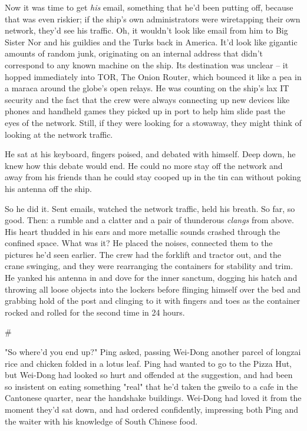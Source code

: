 Now it was time to get \emph{his} email, something that he'd been
putting off, because that was even riskier; if the ship's own
administrators were wiretapping their own network, they'd see his
traffic. Oh, it wouldn't look like email from him to Big Sister Nor
and his guildies and the Turks back in America. It'd look like
gigantic amounts of random junk, originating on an internal address
that didn't correspond to any known machine on the ship. Its
destination was unclear -- it hopped immediately into TOR, The
Onion Router, which bounced it like a pea in a maraca around the
globe's open relays. He was counting on the ship's lax IT security
and the fact that the crew were always connecting up new devices
like phones and handheld games they picked up in port to help him
slide past the eyes of the network. Still, if they were looking for
a stowaway, they might think of looking at the network traffic.

He sat at his keyboard, fingers poised, and debated with himself.
Deep down, he knew how this debate would end. He could no more stay
off the network and away from his friends than he could stay cooped
up in the tin can without poking his antenna off the ship.

So he did it. Sent emails, watched the network traffic, held his
breath. So far, so good. Then: a rumble and a clatter and a pair of
thunderous \emph{clangs} from above. His heart thudded in his ears
and more metallic sounds crashed through the confined space. What
was it? He placed the noises, connected them to the pictures he'd
seen earlier. The crew had the forklift and tractor out, and the
crane swinging, and they were rearranging the containers for
stability and trim. He yanked his antenna in and dove for the inner
sanctum, dogging his hatch and throwing all loose objects into the
lockers before flinging himself over the bed and grabbing hold of
the post and clinging to it with fingers and toes as the container
rocked and rolled for the second time in 24 hours.

\#

"So where'd you end up?" Ping asked, passing Wei-Dong another
parcel of longzai rice and chicken folded in a lotus leaf. Ping had
wanted to go to the Pizza Hut, but Wei-Dong had looked so hurt and
offended at the suggestion, and had been so insistent on eating
something "real" that he'd taken the gweilo to a cafe in the
Cantonese quarter, near the handshake buildings. Wei-Dong had loved
it from the moment they'd sat down, and had ordered confidently,
impressing both Ping and the waiter with his knowledge of South
Chinese food.

